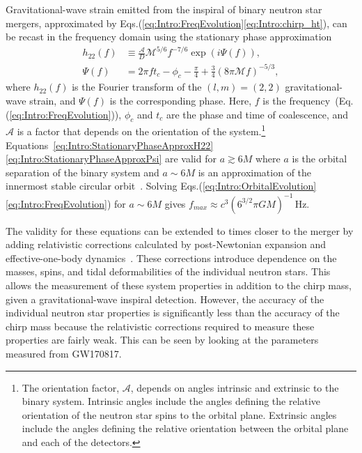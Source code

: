 \documentclass[../Thesis.tex]{subfiles}
\begin{document}
    Gravitational-wave strain emitted from the inspiral of binary neutron star mergers, approximated by Eqs.(\ref{eq:Intro:FreqEvolution}\Hyphdash*\ref{eq:Intro:chirp_ht}), can be recast in the frequency domain using the stationary phase approximation~\cite{Cutler1994}
    \begin{align}
        h_{22}(f) & \equiv \frac{\mathcal{A}}{D}\mathcal{M}^{5/6}f^{-7/6} \exp(i\Psi(f)), \label{eq:Intro:StationaryPhaseApproxH22} \\
        \Psi(f) & = 2\pi f t_c - \phi_c - \frac{\pi}{4} +\frac{3}{4}\left(8\pi\mathcal{M}f\right)^{-5/3}, \label{eq:Intro:StationaryPhaseApproxPsi} 
    \end{align}
    where $h_{22}(f)$ is the Fourier transform of the $(l,m)=(2,2)$ gravitational-wave strain, and $\Psi(f)$ is the corresponding phase.
    Here, $f$ is the frequency~(Eq.(\ref{eq:Intro:FreqEvolution})), $\phi_c$ and $t_c$ are the phase and time of coalescence, and $\mathcal{A}$ is a factor that depends on the orientation of the system.\footnote{The orientation factor, $\mathcal{A}$, depends on angles intrinsic and extrinsic to the binary system. Intrinsic angles include the angles defining the relative orientation of the neutron star spins to the orbital plane. Extrinsic angles include the angles defining the relative orientation between the orbital plane and each of the detectors.}
    Equations~\ref{eq:Intro:StationaryPhaseApproxH22}\Hyphdash*\ref{eq:Intro:StationaryPhaseApproxPsi} are valid for $a \gtrsim 6M$ where $a$ is the orbital separation of the binary system and $a\sim 6M$ is an approximation of the innermost stable circular orbit~\cite{Cutler1994}.
    Solving Eqs.(\ref{eq:Intro:OrbitalEvolution}\Hyphdash*\ref{eq:Intro:FreqEvolution}) for $a \sim 6M$ gives $f_{max}\approx c^3 ( 6^{3/2}\pi G M )^{-1}\,\mathrm{Hz}$.
    \par
   
    The validity for these equations can be extended to times closer to the merger by adding relativistic corrections calculated by post-Newtonian expansion and effective-one-body dynamics~\cite{Cutler1994,Blanchet1995, Buonanno1999,Droz1999,Damour2012,Yagi2013,Blanchet2014}. 
    These corrections introduce dependence on the masses, spins, and tidal deformabilities of the individual neutron stars.
    This allows the measurement of these system properties in addition to the chirp mass, given a gravitational-wave inspiral detection.
    However, the accuracy of the individual neutron star properties is significantly less than the accuracy of the chirp mass because the relativistic corrections required to measure these properties are fairly weak. 
    This can be seen by looking at the parameters measured from GW170817.
\end{document}
